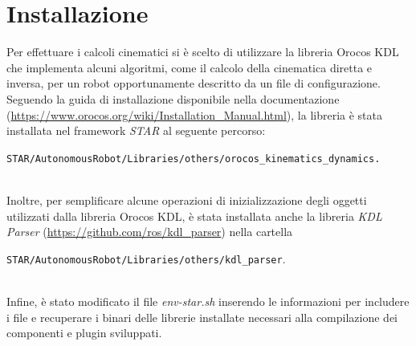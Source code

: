 \section{Installazione}
Per effettuare i calcoli cinematici si è scelto di utilizzare la libreria Orocos KDL che implementa alcuni algoritmi, come il calcolo della cinematica diretta e inversa, per un robot opportunamente descritto da un file di configurazione. Seguendo la guida di installazione disponibile nella documentazione (\url{https://www.orocos.org/wiki/Installation_Manual.html}), la libreria è stata installata nel framework \textit{STAR} al seguente percorso: \\ 
\centerline{\texttt{STAR/AutonomousRobot/Libraries/others/orocos\_kinematics\_dynamics.}} \\
Inoltre, per semplificare alcune operazioni di inizializzazione degli oggetti utilizzati dalla libreria Orocos KDL, è stata installata anche la libreria \textit{KDL Parser} (\url{https://github.com/ros/kdl_parser}) nella cartella \\ \centerline{\texttt{STAR/AutonomousRobot/Libraries/others/kdl\_parser}.} \\ Infine, è stato modificato il file \textit{env-star.sh} inserendo le informazioni per includere i file e recuperare i binari delle librerie installate necessari alla compilazione dei componenti e plugin sviluppati.

